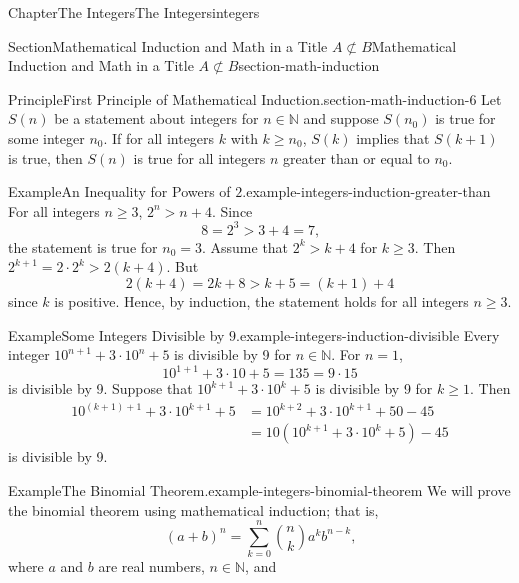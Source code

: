\documentclass[oneside,10pt,]{book}
\numberwithin{equation}{section}
\newcommand{\notsubset}{\not\subset}
\newcommand{\gt}{>}
\begin{document}
\begin{chapterptx}{Chapter}{The Integers}{}{The Integers}{}{}{integers}
\begin{sectionptx}{Section}{Mathematical Induction and Math in a Title \(A\notsubset B\)}{}{Mathematical Induction and Math in a Title \(A\notsubset B\)}{}{}{section-math-induction}
\begin{principle}{Principle}{First Principle of Mathematical Induction.}{}{section-math-induction-6}%
%
Let \(S(n)\) be a statement about integers for  \(n \in {\mathbb N}\) and suppose \(S(n_0)\) is true for some integer \(n_0\).  If for all integers \(k\) with \(k \geq n_0\), \(S(k)\) implies that \(S(k+1)\) is true, then \(S(n)\) is true for all integers \(n\) greater than or equal to \(n_0\).%
\end{principle}
\begin{example}{Example}{An Inequality for Powers of \(2\).}{example-integers-induction-greater-than}%
For all integers \(n \geq 3\), \(2^n \gt n + 4\). Since%
\begin{equation*}
8 = 2^3 \gt 3 + 4 = 7\text{,}
\end{equation*}
the statement is true for \(n_0 = 3\).  Assume that \(2^k \gt k + 4\) for \(k \geq 3\).  Then \(2^{k + 1} = 2 \cdot 2^{k} \gt 2(k + 4)\).  But%
\begin{equation*}
2(k + 4) = 2k + 8 \gt k + 5 = (k + 1) + 4
\end{equation*}
since \(k\) is positive.  Hence, by induction, the statement holds for all integers \(n \geq 3\).%
\end{example}
\begin{example}{Example}{Some Integers Divisible by \(9\).}{example-integers-induction-divisible}%
Every integer \(10^{n + 1} + 3 \cdot 10^n + 5\) is divisible by 9 for \(n \in {\mathbb N}\).  For \(n = 1\),%
\begin{equation*}
10^{1 + 1} + 3 \cdot 10 + 5 = 135 = 9 \cdot 15
\end{equation*}
is divisible by 9.  Suppose that \(10^{k + 1} + 3 \cdot 10^k + 5\) is divisible by 9 for \(k \geq 1\).  Then%
\begin{align*}
10^{(k + 1) + 1} + 3 \cdot 10^{k + 1} + 5& = 10^{k + 2} + 3 \cdot 10^{k + 1} + 50 - 45\\
& = 10 (10^{k + 1} + 3 \cdot 10^{k} + 5) - 45
\end{align*}
is divisible by 9.%
\end{example}
\begin{example}{Example}{The Binomial Theorem.}{example-integers-binomial-theorem}%
We will prove the binomial theorem using mathematical induction; that is,%
\begin{equation*}
(a + b)^n = \sum_{k = 0}^{n} \binom{n}{k} a^k b^{n - k}\text{,}
\end{equation*}
where \(a\) and \(b\) are real numbers, \(n \in \mathbb{N}\), and%

\end{example}
\end{sectionptx}
\end{chapterptx}
\end{document}
